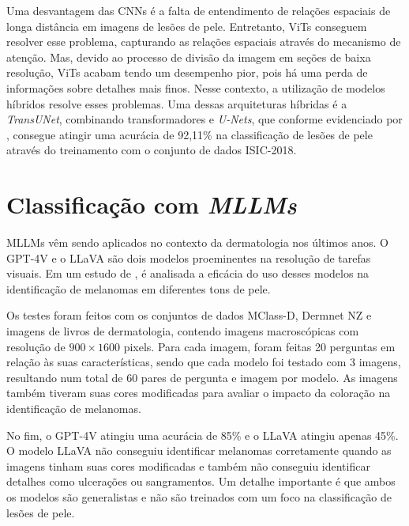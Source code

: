 Uma desvantagem das \acp{CNN} é a falta de entendimento de relações espaciais de longa distância em imagens de lesões
de pele. Entretanto, \acp{ViT} conseguem resolver esse problema, capturando as relações espaciais através do mecanismo
de atenção. Mas, devido ao processo de divisão da imagem em seções de baixa resolução, \acp{ViT} acabam tendo um
desempenho pior, pois há uma perda de informações sobre detalhes mais finos. Nesse contexto, a utilização de modelos
híbridos resolve esses problemas. Uma dessas arquiteturas híbridas é a \textit{TransUNet}, combinando transformadores e
\textit{U-Nets}, que conforme evidenciado por \textcite{gulzar2022skin}, consegue atingir uma acurácia de 92,11\% na
classificação de lesões de pele através do treinamento com o conjunto de dados \ac{ISIC}-2018.

\section{Classificação com \textit{MLLMs}}

\acp{MLLM} vêm sendo aplicados no contexto da dermatologia nos últimos anos. O \ac{GPT}-4V e o \ac{LLaVA} são dois
modelos proeminentes na resolução de tarefas visuais. Em um estudo de \textcite{cirone2024assessing}, é analisada a
eficácia do uso desses modelos na identificação de melanomas em diferentes tons de pele.

Os testes foram feitos com os conjuntos de dados MClass-D, Dermnet NZ e imagens de livros de dermatologia, contendo
imagens macroscópicas com resolução de
\begin{math}900 \times 1600\end{math} pixels. Para cada imagem, foram feitas 20 perguntas em relação às suas características, sendo que cada modelo foi testado com 3
imagens, resultando num total de 60 pares de pergunta e imagem por modelo. As imagens também tiveram suas cores modificadas para avaliar o impacto da coloração na
identificação de melanomas.


No fim, o \ac{GPT}-4V atingiu uma acurácia de 85\% e o \ac{LLaVA} atingiu apenas 45\%. O modelo \ac{LLaVA} não
conseguiu identificar melanomas corretamente quando as imagens tinham suas cores modificadas e também não conseguiu
identificar detalhes como ulcerações ou sangramentos. Um detalhe importante é que ambos os modelos são generalistas e
não são treinados com um foco na classificação de lesões de pele.

